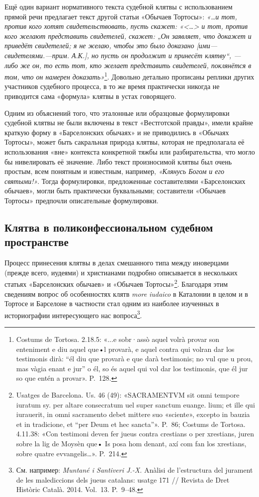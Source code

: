 Ещё один вариант нормативного текста судебной клятвы с использованием прямой речи предлагает текст другой статьи «Обычаев Тортосы»: \emph{«…и тот, против кого хотят свидетельствовать, пусть скажет: «<…> и тот, против кого желают представить свидетелей, скажет: „Он заявляет, что докажет и приведёт свидетелей; я не желаю, чтобы это было доказано [ими---свидетелями.---прим. А.К.], но пусть он продолжит и принесёт клятву“, --- либо же он, то есть тот, кто желает представить свидетелей, поклянётся в том, что он намерен доказать»}\footnote{Costums de Tortosa. 2.18.5: «...e sobr·assò aquel volrà provar son enteniment e diu aquel que•l provarà, e aquel contra qui volran dar los testimonis dirà: “él diu que provarà e que darà testimonis; no vul que u prou, mas vàgia enant e jur” o él, so és aquel qui vol dar los testimonis, que él jur so que entén a provar». P.~128.}. Довольно детально прописаны реплики других участников судебного процесса, в то же время практически никогда не приводится сама «формула» клятвы в устах говорящего.

Одним из объяснений того, что эталонные или образцовые формулировки судебной клятвы не были включены в текст «Вестготской правды», имели крайне краткую форму в «Барселонских обычаях» и не приводились в «Обычаях Тортосы», может быть сакральная природа клятвы, которая не предполагала её использования «вне» контекста конкретной тяжбы или разбирательства, что могло бы нивелировать её значение. Либо текст произносимой клятвы был очень простым, всем понятным и известным, например, \emph{«Клянусь Богом и его святыми!»}. Тогда формулировки, предложенные составителями «Барселонских обычаев», могли быть практически буквальными; составители «Обычаев Тортосы» предпочли описательные формулировки.

\subsection{Клятва в поликонфессиональном судебном пространстве}

Процесс принесения клятвы в делах смешанного типа между иноверцами (прежде всего, иудеями) и христианами подробно описывается в нескольких статьях «Барселонских обычаев» и «Обычаев Тортосы»\footnote{Usatges de Barcelona. Us. 46 (49): «SACRAMENTVM sit omni tempore iuratum sy. per altare consecratum uel super sanctum euange. lium; et ille qui iurauerit, in omni sacramento debet mittere suo «sciente», excepto in bauzia et in tradicione, et “per Deum et hec sancta”». P.~86; Costums de Tortosa. 4.11.38: «Con testimoni deven fer jueus contra crestians o per xrestians, juren sobre la lig de Moysèn que• Is posa hom denant, axí com fan los xrestians, sobre quatre evvangelis…». P.~214.}. Благодаря этим сведениям вопрос об особенностях клятв \emph{more}\emph{ }\emph{iudaico} в Каталонии в целом и в Тортосе и Барселоне в частности стал одним из наиболее изученных в историографии интересующего нас вопроса\footnote{См. например: \emph{Muntané i Santiveri J.-X.} Anàlisi de l'estructura del jurament de les malediccions dels jueus catalans: usatge 171 // Revista de Dret Històric Català. 2014. Vol.~13. P.~9--48.}.

